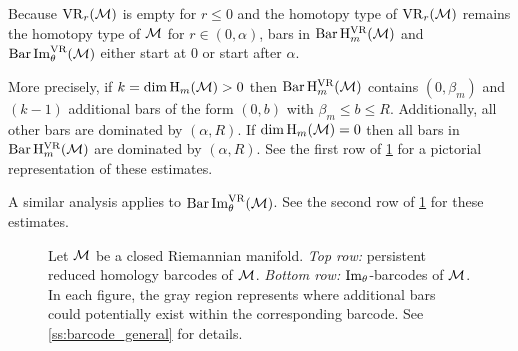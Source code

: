 Because $\mathrm{VR}_r(\mathcal{M})$ is empty for \(r \leq 0\) and the homotopy type of $\mathrm{VR}_r(\mathcal{M})$ remains the homotopy type of $\mathcal{M}$ for $r \in (0, \alpha)$, bars in \(\operatorname{Bar} \mathrm{H}_m^{\mathrm{VR}}(\mathcal{M})\) and $\operatorname{Bar}\operatorname{Im}_\theta^{\mathrm{VR}}(\mathcal{M})$ either start at $0$ or start after $\alpha$.

More precisely, if \(k = \dim \operatorname{H}_m(\mathcal{M}) > 0\) then $\operatorname{Bar}\mathrm{H}_m^{\mathrm{VR}}(\mathcal{M})$ contains $(0, \beta_m)$ and \((k - 1)\) additional bars of the form \((0, b)\) with \(\beta_m \leq b \leq R\).
Additionally, all other bars are dominated by \((\alpha, R)\).
If \(\dim \operatorname{H}_m(\mathcal{M}) = 0\) then all bars in \(\operatorname{Bar}\mathrm{H}_m^{\mathrm{VR}}(\mathcal{M})\) are dominated by \((\alpha, R)\).
See the first row of \cref{fig:barcodes_general} for a pictorial representation of these estimates.

A similar analysis applies to $\operatorname{Bar}\operatorname{Im}_\theta^{\mathrm{VR}}(\mathcal{M})$.
See the second row of \cref{fig:barcodes_general} for these estimates.

\begin{figure}
	\centering
	
	\caption{Let $\mathcal{M}$ be a closed Riemannian manifold.
    \emph{Top row:} persistent reduced homology barcodes of $\mathcal{M}$.
	\emph{Bottom row:} $\operatorname{Im}_\theta$-barcodes of $\mathcal{M}$.
    In each figure, the gray region represents where additional bars could potentially exist within the corresponding barcode.
    See \cref{ss:barcode_general} for details.}
	\label{fig:barcodes_general}
\end{figure}